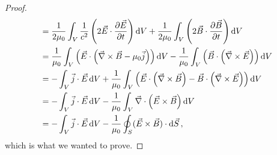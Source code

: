 \documentclass[11pt]{article}
\begin{document}
\begin{enumerate}
\begin{proof}
\begin{align*}
            &= \frac{1}{2\mu_0}\int_V \frac{1}{c^2}\left(2\vec{E}\cdot\pdv{\vec{E}}{t}\right)\dd{V} + \frac{1}{2\mu_0}\int_V \left(2\vec{B}\cdot\pdv{\vec{B}}{t}\right)\dd{V} \\
            &= \frac{1}{\mu_0}\int_V \left(\vec{E}\cdot\left(\vec{\nabla}\times \vec{B}-\mu_0\vec{j}\right)\right)\dd{V} - \frac{1}{\mu_0}\int_V \left(\vec{B}\cdot\left(\vec{\nabla}\times \vec{E}\right)\right)\dd{V} \\
            &= -\int_V \vec{j}\cdot \vec{E}\dd{V} + \frac{1}{\mu_0}\int_V \left(\vec{E}\cdot \left(\vec{\nabla}\times \vec{B}\right) - \vec{B}\cdot \left(\vec{\nabla}\times \vec{E}\right)\right)\dd{V}\\
            &= -\int_V \vec{j}\cdot \vec{E}\dd{V} - \frac{1}{\mu_0}\int_V \vec{\nabla}\cdot\left(\vec{E}\times\vec{B}\right)\dd{V} \\
            &= -\int_V \vec{j}\cdot \vec{E}\dd{V} - \frac{1}{\mu_0}\oint_S (\vec{E}\times \vec{B})\cdot \dd{\vec{S}},
        \end{align*} which is what we wanted to prove.
    \end{proof}
\end{enumerate}
\end{document}
